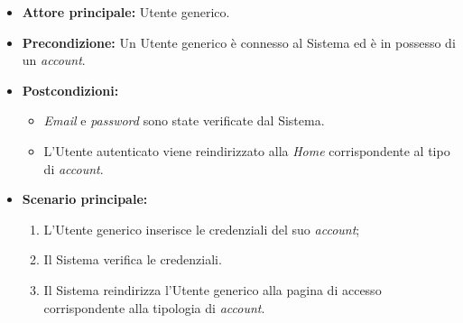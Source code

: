 \label{usecase:Accesso tradizionale}
\begin{itemize}

	\item \textbf{Attore principale:} Utente generico.

	\item \textbf{Precondizione:} Un Utente generico è connesso al Sistema ed è in possesso di un \textit{account}.

	\item \textbf{Postcondizioni:} 
	\begin{itemize}
		\item \textit{Email} e \textit{password} sono state verificate dal Sistema.
		\item L'Utente autenticato viene reindirizzato alla \textit{Home} corrispondente al tipo di \textit{account}.
	\end{itemize}
	\item \textbf{Scenario principale:}
	\begin{enumerate}
		\item L'Utente generico inserisce le credenziali del suo \textit{account};
		\item Il Sistema verifica le credenziali.
		\item Il Sistema reindirizza l'Utente generico alla pagina di accesso corrispondente alla tipologia di \textit{account}.
	\end{enumerate}

\end{itemize}
